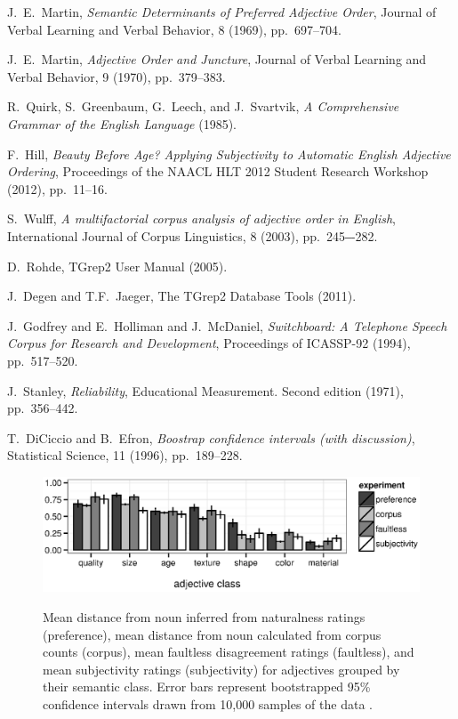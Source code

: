 \documentclass{pnastwo}
\begin{document}
\begin{article}
\begin{thebibliography}{10}
				
	J.~E.~Martin, {\em Semantic Determinants of Preferred Adjective Order}, Journal of Verbal Learning and Verbal Behavior, 8 (1969), pp.~697--704. 	
	
	J.~E.~Martin, {\em Adjective Order and Juncture}, Journal of Verbal Learning and Verbal Behavior, 9 (1970), pp.~379--383. 
	
	
	R.~Quirk, S.~Greenbaum, G.~Leech, and J.~Svartvik, {\em A Comprehensive Grammar of the English Language} (1985).
	
	F.~Hill, {\em Beauty Before Age? Applying Subjectivity to 	Automatic English Adjective Ordering}, Proceedings of the NAACL HLT 2012 Student Research Workshop (2012), pp.~11--16.
	
		
	S.~Wulff, {\em A multifactorial corpus analysis of adjective order in English}, International Journal of Corpus Linguistics, 8 (2003), pp.~245‒-282.
	
	D.~Rohde, TGrep2 User Manual (2005).
	
	J.~Degen and T.F.~Jaeger, The TGrep2 Database Tools (2011).
	
	J.~Godfrey and E.~Holliman and J.~McDaniel, {\em Switchboard: A Telephone Speech Corpus for Research and Development}, Proceedings of ICASSP-92 (1994),
	pp.~517--520.
	
	J.~Stanley, {\em Reliability}, Educational Measurement. Second edition (1971), pp.~356--442.	
	
	T.~DiCiccio and B.~Efron, {\em Boostrap confidence intervals (with discussion)}, Statistical Science, 11 (1996), pp.~189--228.
	
\end{thebibliography}


\end{article}

\begin{figure}
	\centering
	{\includegraphics[width=.75\linewidth]{plots/expt_results-new.eps}}\par
	\caption{Mean distance from noun inferred from naturalness ratings (preference), mean distance from noun calculated from corpus counts (corpus),  mean faultless disagreement ratings (faultless), and mean subjectivity ratings (subjectivity) for adjectives grouped by their semantic class. Error bars represent bootstrapped 95\% confidence intervals drawn from 10,000 samples of the data \cite{diciccioefron1996}.}\label{results}
\end{figure}
\end{document}
